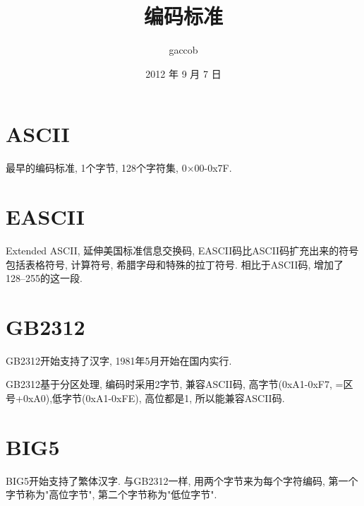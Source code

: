 

\title {\ZHH \huge 编码标准}
\author {\small gaccob}
\date {\small 2012 年 9 月 7 日}
\maketitle

\section*{\ZHH ASCII}{
    {最早的编码标准, 1个字节, 128个字符集, 0×00-0x7F. }\par
}

\section*{\ZHH EASCII}{
    {Extended ASCII, 延伸美国标准信息交换码, EASCII码比ASCII码扩充出来的符号包括表格符号, 计算符号, 希腊字母和特殊的拉丁符号. 相比于ASCII码, 增加了128–255的这一段. }\par
}

\section*{\ZHH GB2312}{
    {GB2312开始支持了汉字, 1981年5月开始在国内实行. }\par
    {GB2312基于分区处理, 编码时采用2字节, 兼容ASCII码,  高字节(0xA1-0xF7, =区号+0xA0),低字节(0xA1-0xFE), 高位都是1, 所以能兼容ASCII码. }\par
}

\section*{\ZHH BIG5}{
    {BIG5开始支持了繁体汉字. 与GB2312一样, 用两个字节来为每个字符编码, 第一个字节称为"高位字节", 第二个字节称为"低位字节". }\par
}


